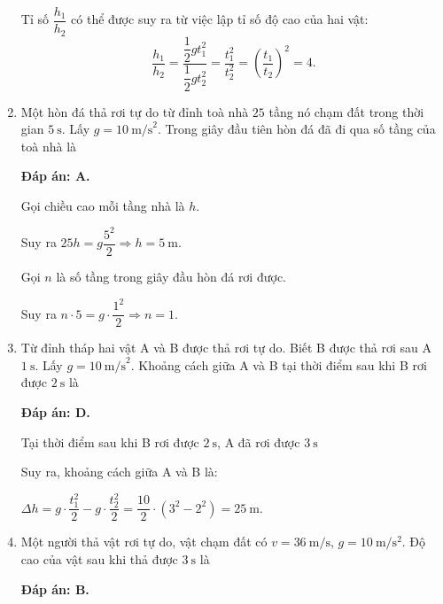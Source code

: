 \begin{enumerate}[label=\bfseries Câu \arabic*:]
{		Tỉ số $\dfrac{h_1}{h_2}$ có thể được suy ra từ việc lập tỉ số độ cao của hai vật: $$\dfrac{h_1}{h_2}=\dfrac{\dfrac{1}{2}gt_1^2}{\dfrac{1}{2}gt_2^2}=\dfrac{t_1^2}{t_2^2}=\left( \dfrac{t_1}{t_2}\right)^2=4.$$
	}
	
	\item {}
	
	
	{Một hòn đá thả rơi tự do từ đỉnh toà nhà $25$ tầng nó chạm đất trong thời gian $5\ \text{s}$. Lấy $g=10\ \text{m/s}^2$. Trong giây đầu tiên hòn đá đã đi qua số tầng của toà nhà là
	}
	\hideall
	{	\textbf{Đáp án: A.}
		
		Gọi chiều cao mỗi tầng nhà là $h$. 
		
		Suy ra $25h=g\dfrac{5^2}{2}\Rightarrow h=5\ \text{m}$.
		
		Gọi $n$ là số tầng trong giây đầu hòn đá rơi được.
		
		Suy ra $n\cdot 5=g\cdot \dfrac{1^2}{2}\Rightarrow n=1$.
	}
	\item {}
	
	
	{Từ đỉnh tháp hai vật A và B được thả rơi tự do. Biết B được thả rơi sau A $1\ \text{s}$. Lấy $g=10\ \text{m/s}^2$. Khoảng cách giữa A và B tại thời điểm sau khi B rơi được $2\ \text{s}$ là
		
	}
	\hideall
	{	\textbf{Đáp án: D.}
		
		Tại thời điểm sau khi B rơi được $2\ \text{s}$, A đã rơi được $3\ \text{s}$
		
		Suy ra, khoảng cách giữa A và B là:
		
		$\Delta h=g\cdot\dfrac{t_1^2}{2}-g\cdot\dfrac{t_2^2}{2}=\dfrac{10}{2}\cdot \left( 3^2-2^2\right)=25\ \text{m}$.
	}
	\item {}
	
	
	{Một người thả vật rơi tự do, vật chạm đất có $v=\SI{36}{\meter/\second}$, $g=\SI{10}{\meter/\second^2}$. Độ cao của vật sau khi thả được $\SI{3}{\second}$ là
	}
	\hideall
	{	\textbf{Đáp án: B.}
		
}
\end{enumerate}
